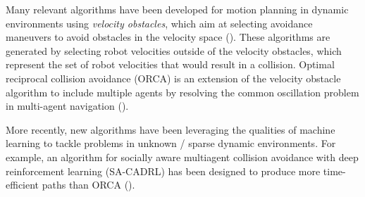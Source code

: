 Many relevant algorithms have been developed for motion planning in dynamic environments using \textit{velocity obstacles}, which aim at selecting avoidance maneuvers to avoid obstacles in the velocity space (\cite{fiorini1998motion}). These algorithms are generated by selecting robot velocities outside of the velocity obstacles, which represent the set of robot velocities that would result in a collision.
Optimal reciprocal collision avoidance (ORCA) is an extension of the velocity obstacle algorithm to include multiple agents by resolving the common oscillation problem in multi-agent navigation (\cite{van2008reciprocal, van2011reciprocal, snape2011hybrid}). 

More recently, new algorithms have been leveraging the qualities of machine learning to tackle problems in unknown / sparse dynamic environments. For example, an algorithm for socially aware multiagent collision avoidance with deep reinforcement learning (SA-CADRL) has been designed to produce more time-efficient paths than ORCA (\cite{chen2017socially, long2018towards}).

